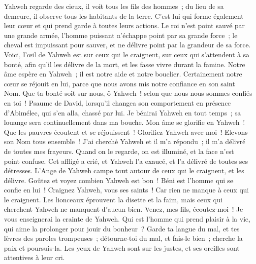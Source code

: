 \begin{multicols}{2}
Yahweh regarde des cieux, il voit tous les fils des hommes~;
du lieu de sa demeure, il observe tous les habitants de la terre.
C'est lui qui forme également leur cœur et qui prend garde à toutes leurs actions.
Le roi n'est point sauvé par une grande armée, l'homme puissant n'échappe point par sa grande force~;
le cheval est impuissant pour sauver, et ne délivre point par la grandeur de sa force.
Voici, l'œil de Yahweh est sur ceux qui le craignent, sur ceux qui s'attendent à sa bonté,
afin qu'il les délivre de la mort, et les fasse vivre durant la famine.
Notre âme espère en Yahweh~; il est notre aide et notre bouclier.
Certainement notre cœur se réjouit en lui, parce que nous avons mis notre confiance en son saint Nom.
Que ta bonté soit sur nous, ô Yahweh~! selon que nous nous sommes confiés en toi~!
\VerseOne{}Psaume de David, lorsqu'il changea son comportement en présence d'Abimélec, qui s'en alla, chassé par lui.
 Je bénirai Yahweh en tout temps~; sa louange sera continuellement dans ma bouche.
 Mon âme se glorifie en Yahweh~! Que les pauvres écoutent et se réjouissent~!
 Glorifiez Yahweh avec moi~! Elevons son Nom tous ensemble~!
 J'ai cherché Yahweh et il m'a répondu~; il m'a délivré de toutes mes frayeurs.
 Quand on le regarde, on est illuminé, et la face n'est point confuse.
 Cet affligé a crié, et Yahweh l'a exaucé, et l'a délivré de toutes ses détresses.
 L'Ange de Yahweh campe tout autour de ceux qui le craignent, et les délivre.
 Goûtez et voyez combien Yahweh est bon~! Béni est l'homme qui se confie en lui~!
 Craignez Yahweh, vous ses saints~! Car rien ne manque à ceux qui le craignent.
 Les lionceaux éprouvent la disette et la faim, mais ceux qui cherchent Yahweh ne manquent d'aucun bien.
 Venez, mes fils, écoutez-moi~! Je vous enseignerai la crainte de Yahweh.
 Qui est l'homme qui prend plaisir à la vie, qui aime la prolonger pour jouir du bonheur~?
 Garde ta langue du mal, et tes lèvres des paroles trompeuses~;
 détourne-toi du mal, et fais-le bien~; cherche la paix et poursuis-la.
 Les yeux de Yahweh sont sur les justes, et ses oreilles sont attentives à leur cri.

\end{multicols}
